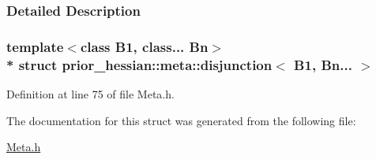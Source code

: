 \subsubsection{Detailed Description}
\subsubsection*{template$<$class B1, class... Bn$>$\\*
struct prior\+\_\+hessian\+::meta\+::disjunction$<$ B1, Bn... $>$}



Definition at line 75 of file Meta.\+h.



The documentation for this struct was generated from the following file\+:\begin{DoxyCompactItemize}
\item 
\hyperlink{Meta_8h}{Meta.\+h}\end{DoxyCompactItemize}
